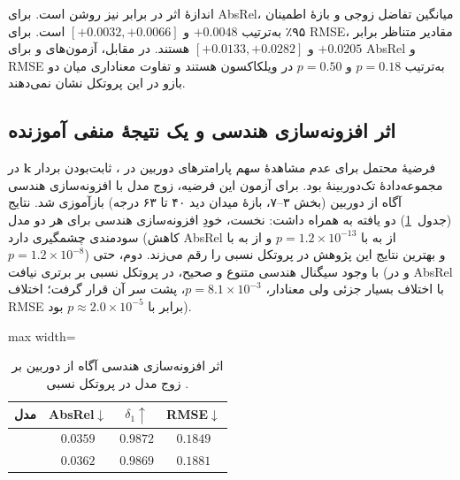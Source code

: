 اندازهٔ اثر  در برابر \publishedbasemodel{} نیز روشن است. برای AbsRel، میانگین تفاضل زوجی و بازهٔ اطمینان ۹۵٪ به‌ترتیب
$+0.0048$ و $[+0.0032,+0.0066]$ است. برای RMSE، مقادیر متناظر برابر
$+0.0205$ و $[+0.0133,+0.0282]$ هستند. در مقابل، آزمون‌های \proposedmodel{} و \controlmodel{} برای AbsRel و RMSE به‌ترتیب $p=0.18$ و $p=0.50$ در ویلکاکسون هستند و تفاوت معناداری میان دو بازو در این پروتکل نشان نمی‌دهند.

\subsection{اثر افزونه‌سازی هندسی و یک نتیجهٔ منفی آموزنده}
\label{subsec:aug_basic_results}

فرضیهٔ محتمل برای عدم مشاهدهٔ سهم پارامترهای دوربین در ، ثابت‌بودن بردار $\mathbf{k}$ در مجموعه‌دادهٔ تک‌دوربینهٔ  بود. برای آزمون این فرضیه، زوج مدل  با افزونه‌سازی هندسی آگاه از دوربین (بخش ۳--۷، بازهٔ میدان دید ۴۰ تا ۶۳ درجه) بازآموزی شد. نتایج (جدول~\ref{tab:nyu_basic_aug}) دو یافته به همراه داشت: نخست، خودِ افزونه‌سازی هندسی برای هر دو مدل سودمندی چشمگیری دارد (کاهش AbsRel \controlmodel{} از  به  با $p=1.2\times10^{-13}$ و \proposedmodel{} از  به  با $p=1.2\times10^{-8}$) و بهترین نتایج این پژوهش در پروتکل نسبی را رقم می‌زند. دوم، حتی با وجود سیگنال هندسی متنوع و صحیح، \proposedmodel{} در پروتکل نسبی بر \controlmodel{} برتری نیافت (و در AbsRel با اختلاف بسیار جزئی  ولی معنادار، $p=8.1\times10^{-3}$، پشت سر آن قرار گرفت؛ اختلاف RMSE برابر  با $p\approx2.0\times10^{-5}$ بود).

\begin{table}[htbp]
\centering
\caption{اثر افزونه‌سازی هندسی آگاه از دوربین بر زوج مدل  در پروتکل نسبی .}
\label{tab:nyu_basic_aug}
\begin{adjustbox}{max width=\textwidth}
\begin{tabular}{lccc}
\hline
مدل & AbsRel$\downarrow$ & $\delta_1\uparrow$ & RMSE$\downarrow$ \\ \hline
\tablecontrolmodel{} & $\mathbf{0.0359}$ & $\mathbf{0.9872}$ & $\mathbf{0.1849}$ \\
\tableproposedmodel{} & $0.0362$ & $0.9869$ & $0.1881$ \\ \hline
\end{tabular}
\end{adjustbox}
\end{table}

